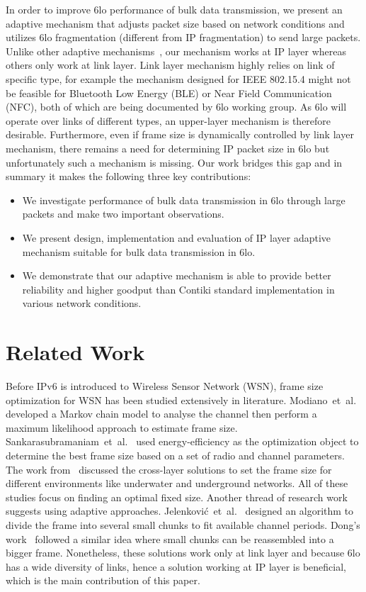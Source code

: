 \documentclass[runningheads,a4paper]{llncs}
\begin{document}
In order to improve 6lo performance of bulk data transmission, we present an adaptive mechanism that adjusts packet size based on network conditions and utilizes 6lo fragmentation (different from IP fragmentation) to send large packets. Unlike other adaptive mechanisms~\cite{Dong2010, Jele2008}, our mechanism works at IP layer whereas others only work at link layer. Link layer mechanism highly relies on link of specific type, for example the mechanism designed for IEEE 802.15.4 might not be feasible for Bluetooth Low Energy (BLE) or Near Field Communication (NFC), both of which are being documented by 6lo working group. As 6lo will operate over links of different types, an upper-layer mechanism is therefore desirable. Furthermore, even if frame size is dynamically controlled by link layer mechanism, there remains a need for determining IP packet size in 6lo but unfortunately such a mechanism is missing. Our work bridges this gap and in summary it makes the following three key contributions:
\begin{itemize}
\item We investigate performance of bulk data transmission in 6lo through large packets and make two important observations.
\item We present design, implementation and evaluation of IP layer adaptive mechanism suitable for bulk data transmission in 6lo.
\item We demonstrate that our adaptive mechanism is able to provide better reliability and higher goodput than Contiki standard implementation in various network conditions.
\end{itemize}

\section{Related Work}
Before IPv6 is introduced to Wireless Sensor Network (WSN), frame size optimization for WSN has been studied extensively in literature. Modiano~et~al.~\cite{Modi1999} developed a Markov chain model to analyse the channel then perform a maximum likelihood approach to estimate frame size. Sankarasubramaniam~et~al.~\cite{Sank2003} used energy-efficiency as the optimization object to determine the best frame size based on a set of radio and channel parameters. The work from~\cite{Vura2008} discussed the cross-layer solutions to set the frame size for different environments like underwater and underground networks. All of these studies focus on finding an optimal fixed size. Another thread of research work suggests using adaptive approaches. Jelenkovi\'{c}~et~al.~\cite{Jele2008} designed an algorithm to divide the frame into several small chunks to fit available channel periods. Dong's work~\cite{Dong2010} followed a similar idea where small chunks can be reassembled into a bigger frame. Nonetheless, these solutions work only at link layer and because 6lo has a wide diversity of links, hence a solution working at IP layer is beneficial, which is the main contribution of this paper.
\end{document}
